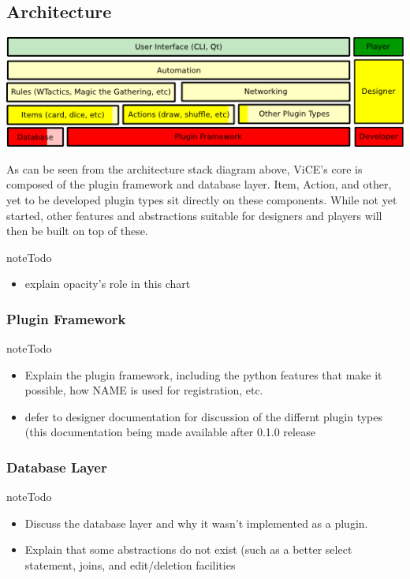 \documentclass[letterpaper,10pt,english]{sphinxmanual}
\begin{document}
\subsection{Architecture}
\label{developer_guide/architecture::doc}\label{developer_guide/architecture:architecture}
\includegraphics{stack_diagram.png}

As can be seen from the architecture stack diagram above, ViCE's core is
composed of the plugin framework and database layer. Item, Action, and other,
yet to be developed plugin types sit directly on these components. While not
yet started, other features and abstractions suitable for designers and
players will then be built on top of these.

\begin{notice}{note}{Todo}
\begin{itemize}
\item {} 
explain opacity's role in this chart

\end{itemize}
\end{notice}


\subsubsection{Plugin Framework}
\label{developer_guide/architecture:plugin-framework}
\begin{notice}{note}{Todo}
\begin{itemize}
\item {} 
Explain the plugin framework, including the python features that make it
possible, how NAME is used for registration, etc.

\item {} 
defer to designer documentation for discussion of the differnt plugin
types (this documentation being made available after 0.1.0 release

\end{itemize}
\end{notice}


\subsubsection{Database Layer}
\label{developer_guide/architecture:database-layer}
\begin{notice}{note}{Todo}
\begin{itemize}
\item {} 
Discuss the database layer and why it wasn't implemented as a plugin.

\item {} 
Explain that some abstractions do not exist (such as a better select
statement, joins, and edit/deletion facilities

\end{itemize}
\end{notice}
\end{document}
